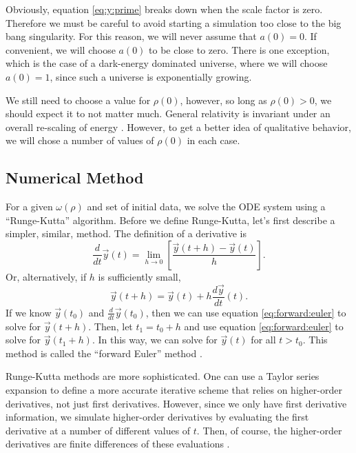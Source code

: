 \documentclass[]{article}
\newcommand{\myvec}[1]{\vec{#1}} %
\newcommand{\diff}[2]{\frac{d #1}{d #2}}
\newcommand{\dd}[1]{\frac{d}{d #1}}
\newcommand{\ddt}{\dd{t}}
\newcommand{\dt}[1]{\diff{#1}{t}}
\begin{document}
Obviously, equation \eqref{eq:y:prime} breaks down when the scale
factor is zero. Therefore we must be careful to avoid starting a
simulation too close to the big bang singularity. For this reason, we
will never assume that $a(0) = 0$. If convenient, we will choose
$a(0)$ to be close to zero. There is one exception, which is the case
of a dark-energy dominated universe, where we will choose $a(0)=1$,
since such a universe is exponentially growing.

We still need to choose a value for $\rho(0)$, however, so long as
$\rho(0) > 0$, we should expect it to not matter much. General
relativity is invariant under an overall re-scaling of energy
\cite{MisnerThorneWheeler,Wald}. However, to get a better idea of
qualitative behavior, we will chose a number of values of $\rho(0)$ in
each case.

\subsection{Numerical Method}
\label{subsec:numerical:method}

For a given $\omega(\rho)$ and set of initial data, we solve the ODE
system using a ``Runge-Kutta'' algorithm. Before we define
Runge-Kutta, let's first describe a simpler, similar, method. The
definition of a derivative is
\begin{equation}
  \label{eq:derivative:definition}
  \ddt\myvec{y}(t) = \lim_{h\to 0}\left[\frac{\myvec{y}(t+h) - \myvec{y}(t)}{h}\right].
\end{equation}
Or, alternatively, if $h$ is sufficiently small,
\begin{equation}
  \label{eq:forward:euler}
  \myvec{y}(t+h) = \myvec{y}(t) + h \dt{\myvec{y}}(t).
\end{equation}
If we know $\myvec{y}(t_0)$ and $\ddt\myvec{y}(t_0)$, then we can use
equation \eqref{eq:forward:euler} to solve for $\myvec{y}(t+h)$. Then,
let $t_1 = t_0 + h$ and use equation \eqref{eq:forward:euler} to solve
for $\myvec{y}(t_1 + h)$. In this way, we can solve for $\myvec{y}(t)$
for all $t > t_0$. This method is called the ``forward Euler'' method
\cite{Heath}.

Runge-Kutta methods are more sophisticated. One can use a Taylor
series expansion to define a more accurate iterative scheme that
relies on higher-order derivatives, not just first
derivatives. However, since we only have first derivative information,
we simulate higher-order derivatives by evaluating the first
derivative at a number of different values of $t$. Then, of course,
the higher-order derivatives are finite differences of these
evaluations \cite{Heath,NumericalRecipes}.
\end{document}
